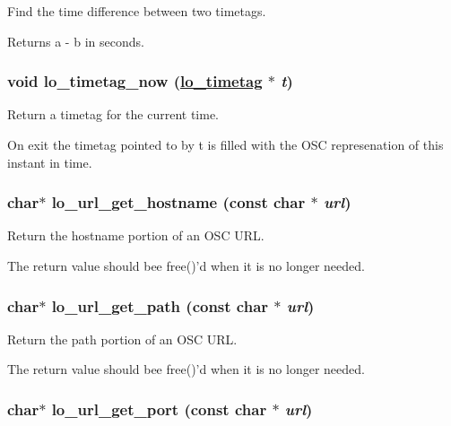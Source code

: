 Find the time difference between two timetags. 

Returns a - b in seconds. \hypertarget{group__liblolowlevel_gd687e21ed611e68748e962502ae63d8e}{
\subsubsection[lo\_\-timetag\_\-now]{\setlength{\rightskip}{0pt plus 5cm}void lo\_\-timetag\_\-now (\hyperlink{structlo__timetag}{lo\_\-timetag} $\ast$ {\em t})}}
\label{group__liblolowlevel_gd687e21ed611e68748e962502ae63d8e}


Return a timetag for the current time. 

On exit the timetag pointed to by t is filled with the OSC represenation of this instant in time. \hypertarget{group__liblolowlevel_gb1b7df7061a0b2cd0db31d3fca1b399b}{
\subsubsection[lo\_\-url\_\-get\_\-hostname]{\setlength{\rightskip}{0pt plus 5cm}char$\ast$ lo\_\-url\_\-get\_\-hostname (const char $\ast$ {\em url})}}
\label{group__liblolowlevel_gb1b7df7061a0b2cd0db31d3fca1b399b}


Return the hostname portion of an OSC URL. 

The return value should bee free()'d when it is no longer needed. \hypertarget{group__liblolowlevel_g617d046cc702a2c5ab8539659381ef18}{
\subsubsection[lo\_\-url\_\-get\_\-path]{\setlength{\rightskip}{0pt plus 5cm}char$\ast$ lo\_\-url\_\-get\_\-path (const char $\ast$ {\em url})}}
\label{group__liblolowlevel_g617d046cc702a2c5ab8539659381ef18}


Return the path portion of an OSC URL. 

The return value should bee free()'d when it is no longer needed. \hypertarget{group__liblolowlevel_g488fb8e96fb86320590c1a8ca389593d}{
\subsubsection[lo\_\-url\_\-get\_\-port]{\setlength{\rightskip}{0pt plus 5cm}char$\ast$ lo\_\-url\_\-get\_\-port (const char $\ast$ {\em url})}}
\label{group__liblolowlevel_g488fb8e96fb86320590c1a8ca389593d}


